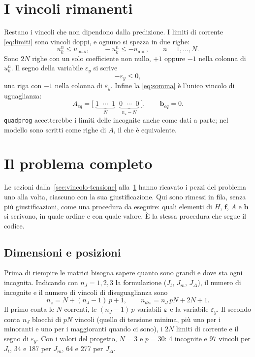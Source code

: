 \documentclass[11pt,a4paper]{article}
\newcommand{\vett}[1]{\boldsymbol{#1}}      %
\begin{document}
\section{I vincoli rimanenti}\label{sec:rimanenti}

Restano i vincoli che non dipendono dalla predizione. I limiti di corrente
\eqref{eq:limiti} sono vincoli doppi, e ognuno si spezza in due righe:
\begin{equation}
  u^n_k \le u_{\max} , \qquad -u^n_k \le -u_{\min} ,
  \qquad n = 1,\dots,N .
  \label{eq:riga-limiti}
\end{equation}
Sono $2N$ righe con un solo coefficiente non nullo, $+1$ oppure $-1$ nella
colonna di $u^n_k$. Il segno della variabile $\varepsilon_y$ si scrive
\begin{equation}
  -\varepsilon_y \le 0 ,
  \label{eq:riga-e}
\end{equation}
una riga con $-1$ nella colonna di $\varepsilon_y$. Infine la \eqref{eq:somma} è l'unico
vincolo di uguaglianza:
\begin{equation}
  A_{eq} = \bigl[\; \underbrace{1 \;\; \cdots \;\; 1}_{N}
              \;\; \underbrace{0 \;\; \cdots \;\; 0}_{n_z - N} \;\bigr] ,
  \qquad \vett{b}_{eq} = 0 .
  \label{eq:uguaglianza}
\end{equation}
\texttt{quadprog} accetterebbe i limiti delle incognite anche come dati a
parte; nel modello sono scritti come righe di $A$, il che è equivalente.

\section{Il problema completo}\label{sec:completo}

Le sezioni dalla~\ref{sec:vincolo-tensione} alla~\ref{sec:rimanenti} hanno
ricavato i pezzi del problema uno alla volta, ciascuno con la sua
giustificazione. Qui sono rimessi in fila, senza più giustificazioni, come una
procedura da eseguire: quali elementi di $H$, $\vett{f}$, $A$ e $\vett{b}$ si scrivono, in
quale ordine e con quale valore. È la stessa procedura che segue il codice.

\subsection{Dimensioni e posizioni}\label{sec:dimensioni}

Prima di riempire le matrici bisogna sapere quanto sono grandi e dove sta ogni
incognita. Indicando con $n_J = 1, 2, 3$ la formulazione ($J_t$, $J_m$,
$J_\Delta$), il numero di incognite e il numero di vincoli di disuguaglianza
sono
\begin{equation}
  n_z = N + (n_J-1)\,p + 1 , \qquad
  n_{dis} = n_J\,pN + 2N + 1 .
  \label{eq:ndis}
\end{equation}
Il primo conta le $N$ correnti, le $(n_J-1)\,p$ variabili $\vett{\varepsilon}$ e la
variabile $\varepsilon_y$. Il secondo conta $n_J$ blocchi di $pN$ vincoli (quello di tensione
minima, più uno per i minoranti e uno per i maggioranti quando ci sono), i
$2N$ limiti di corrente e il segno di $\varepsilon_y$. Con i valori del progetto, $N = 3$
e $p = 30$: 4 incognite e 97 vincoli per $J_t$, 34 e 187 per $J_m$, 64 e 277
per $J_\Delta$.
\end{document}
